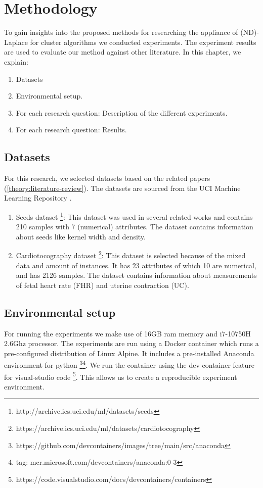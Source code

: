 \chapter{Methodology}

To gain insights into the proposed methods for researching the appliance of (ND)-Laplace for cluster algorithms we conducted experiments.
The experiment results are used to evaluate our method against other literature.
In this chapter, we explain:
\begin{enumerate}

  \item Datasets
  \item Environmental setup.
  \item For each research question: Description of the different experiments.
  \item For each research question: Results.
\end{enumerate}

\section{Datasets} \label{datasets-section}
For this research, we selected datasets based on the related papers (\ref{theory:literature-review}).
The datasets are sourced from the UCI Machine Learning Repository \citep{noauthor_uci_nodate}.
\begin{enumerate}
  \item Seeds dataset \footnote{http://archive.ics.uci.edu/ml/datasets/seeds}: This dataset was used in several related works and contains 210 samples with 7 (numerical) attributes.
        The dataset contains information about seeds like kernel width and density.
  \item Cardiotocography dataset \footnote{https://archive.ics.uci.edu/ml/datasets/cardiotocography}: This dataset is selected because of the mixed data and amount of instances.
        It has 23 attributes of which 10 are numerical, and has 2126 samples.
        The dataset contains information about measurements of fetal heart rate (FHR) and uterine contraction (UC).
\end{enumerate}
\section{Environmental setup}
For running the experiments we make use of 16GB ram memory and i7-10750H 2.6Ghz processor.
The experiments are run using a Docker container which runs a pre-configured distribution of Linux Alpine.
It includes a pre-installed Anaconda environment for python \footnote{https://github.com/devcontainers/images/tree/main/src/anaconda}\footnote{tag: mcr.microsoft.com/devcontainers/anaconda:0-3}.
We run the container using the dev-container feature for visual-studio code \footnote{https://code.visualstudio.com/docs/devcontainers/containers}.
This allows us to create a reproducible experiment environment.
